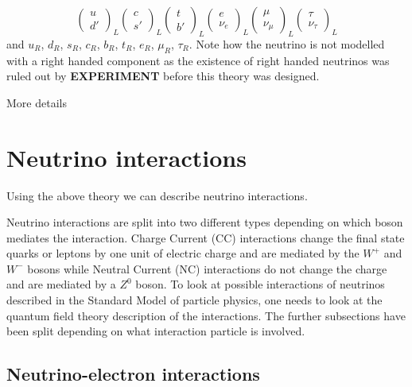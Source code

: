 \begin{equation}
\begin{pmatrix}
    u\\
    d'
\end{pmatrix}_L
\begin{pmatrix}
    c\\
    s'
\end{pmatrix}_L
\begin{pmatrix}
    t\\
    b'
\end{pmatrix}_L
\begin{pmatrix}
    e\\
    \nu_e
\end{pmatrix}_L
\begin{pmatrix}
    \mu\\
    \nu_\mu
\end{pmatrix}_L
\begin{pmatrix}
    \tau\\
    \nu_\tau
\end{pmatrix}_L
\end{equation}
and $u_R$,  $d_R$, $s_R$, $c_R$, $b_R$, $t_R$, $e_R$, $\mu_R$, $\tau_R$. 
Note how the neutrino is not modelled with a right handed component as the existence of right handed neutrinos was ruled out by \textbf{EXPERIMENT} before this theory was designed.

More details
\fi

\section{Neutrino interactions}\label{subsection:Neutrino interactions}
Using the above theory we can describe neutrino interactions.

Neutrino interactions are split into two different types depending on which boson mediates the interaction.
Charge Current (CC) interactions change the final state quarks or leptons by one unit of electric charge and are mediated by the $W^+$ and $W^-$ bosons while Neutral Current (NC) interactions do not change the charge and are mediated by a $Z^0$ boson. 
To look at possible interactions of neutrinos described in the Standard Model of particle physics, one needs to look at the quantum field theory description of the interactions\cite{3Peskin, 2Hallsjo}.  The further subsections have been split depending on what interaction particle is involved.

\subsection{Neutrino-electron interactions}

